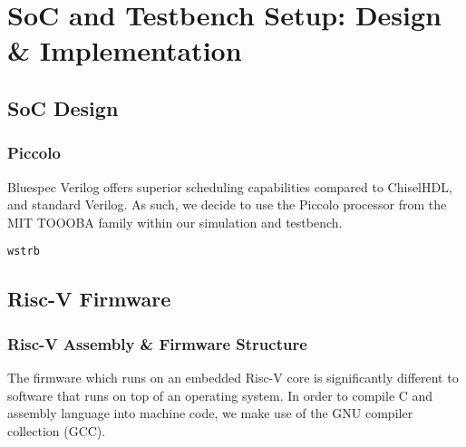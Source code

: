 \documentclass[a4paper,8pt]{report}
\begin{document}



% 


% 


\chapter{SoC and Testbench Setup: Design \& Implementation}
\section{SoC Design}
\subsection{Piccolo}
Bluespec Verilog offers superior scheduling capabilities compared to ChiselHDL,
and standard Verilog. As such, we decide to use the Piccolo processor from the
MIT TOOOBA family within our simulation and testbench. 


\texttt{wstrb}

\section{Risc-V Firmware}
\subsection{Risc-V Assembly \& Firmware Structure}
The firmware which runs on an embedded Risc-V core is significantly different to
software that runs on top of an operating system. In order to compile C and
assembly language into machine code, we make use of the GNU compiler collection
(GCC).
\end{document}
